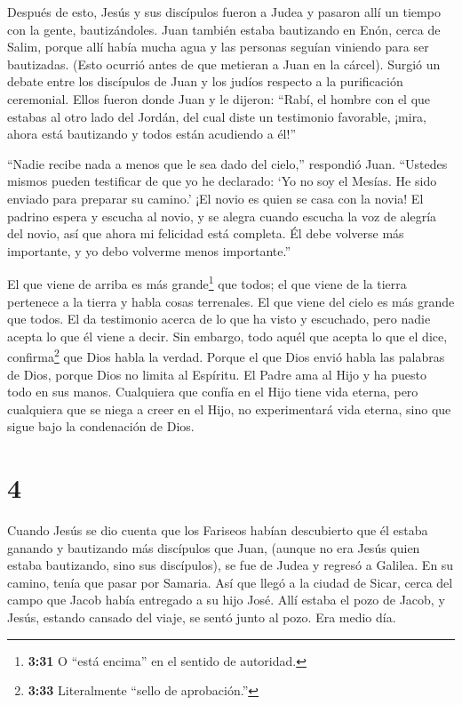  Después de esto, Jesús y sus discípulos fueron a Judea y
pasaron allí un tiempo con la gente, bautizándoles.  Juan
también estaba bautizando en Enón, cerca de Salim, porque allí había
mucha agua y las personas seguían viniendo para ser bautizadas.
 (Esto ocurrió antes de que metieran a Juan en la cárcel).
 Surgió un debate entre los discípulos de Juan y los judíos
respecto a la purificación ceremonial.  Ellos fueron donde
Juan y le dijeron: ``Rabí, el hombre con el que estabas al otro lado del
Jordán, del cual diste un testimonio favorable, ¡mira, ahora está
bautizando y todos están acudiendo a él!''

 ``Nadie recibe nada a menos que le sea dado del cielo,''
respondió Juan.  ``Ustedes mismos pueden testificar de que
yo he declarado: `Yo no soy el Mesías. He sido enviado para preparar su
camino.'  ¡El novio es quien se casa con la novia! El
padrino espera y escucha al novio, y se alegra cuando escucha la voz de
alegría del novio, así que ahora mi felicidad está completa.
 Él debe volverse más importante, y yo debo volverme menos
importante.''

 El que viene de arriba es más grande\footnote{\textbf{3:31}
  O ``está encima'' en el sentido de autoridad.} que todos; el que viene
de la tierra pertenece a la tierra y habla cosas terrenales. El que
viene del cielo es más grande que todos.  El da testimonio
acerca de lo que ha visto y escuchado, pero nadie acepta lo que él viene
a decir.  Sin embargo, todo aquél que acepta lo que el
dice, confirma\footnote{\textbf{3:33} Literalmente ``sello de
  aprobación.''} que Dios habla la verdad.  Porque el que
Dios envió habla las palabras de Dios, porque Dios no limita al
Espíritu.  El Padre ama al Hijo y ha puesto todo en sus
manos.  Cualquiera que confía en el Hijo tiene vida eterna,
pero cualquiera que se niega a creer en el Hijo, no experimentará vida
eterna, sino que sigue bajo la condenación de Dios.

\hypertarget{section-3}{%
\section{4}\label{section-3}}

 Cuando Jesús se dio cuenta que los Fariseos habían
descubierto que él estaba ganando y bautizando más discípulos que Juan,
 (aunque no era Jesús quien estaba bautizando, sino sus
discípulos),  se fue de Judea y regresó a Galilea.
 En su camino, tenía que pasar por Samaria.  Así
que llegó a la ciudad de Sicar, cerca del campo que Jacob había
entregado a su hijo José.  Allí estaba el pozo de Jacob, y
Jesús, estando cansado del viaje, se sentó junto al pozo. Era medio día.

